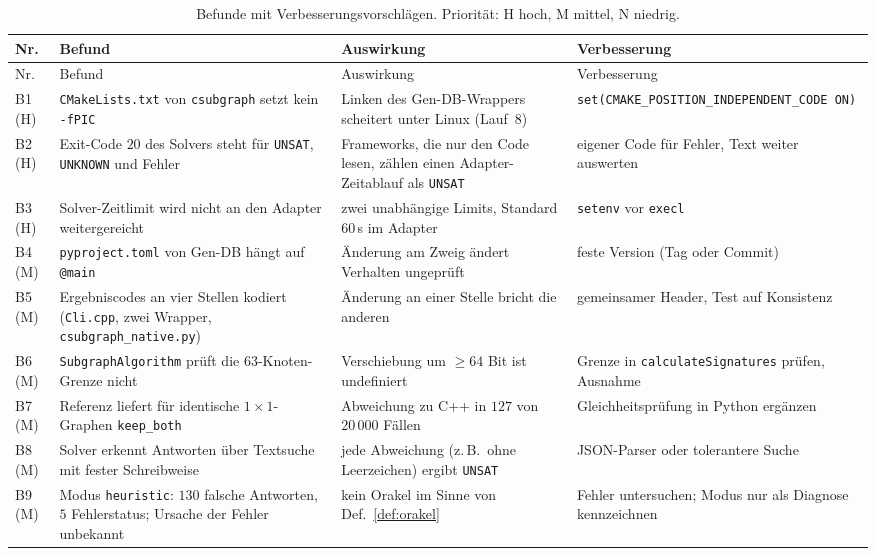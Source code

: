 {\small
\begin{longtable}{@{}L{1.0cm}L{5.3cm}L{4.5cm}L{3.9cm}@{}}
	\caption{Befunde mit Verbesserungsvorschlägen. Priorität: H hoch, M mittel, N niedrig.}
	\label{tab:befunde} \\
	\toprule
	Nr. & Befund & Auswirkung & Verbesserung \\
	\midrule
	\endfirsthead
	\toprule
	Nr. & Befund & Auswirkung & Verbesserung \\
	\midrule
	\endhead
	B1 (H) & \texttt{CMakeLists.txt} von \texttt{csubgraph} setzt kein \texttt{-fPIC} & Linken des Gen-DB-Wrappers scheitert unter Linux (Lauf~8) & \texttt{set(CMAKE\_POSITION\_INDEPENDENT\_CODE ON)} \\[0.4em]
	B2 (H) & Exit-Code $20$ des Solvers steht für \texttt{UNSAT}, \texttt{UNKNOWN} und Fehler & Frameworks, die nur den Code lesen, zählen einen Adapter-Zeitablauf als \texttt{UNSAT} & eigener Code für Fehler, Text weiter auswerten \\[0.4em]
	B3 (H) & Solver-Zeitlimit wird nicht an den Adapter weitergereicht & zwei unabhängige Limits, Standard $60$\,s im Adapter & \texttt{setenv} vor \texttt{execl} \\[0.4em]
	B4 (M) & \texttt{pyproject.toml} von Gen-DB hängt auf \texttt{@main} & Änderung am Zweig ändert Verhalten ungeprüft & feste Version (Tag oder Commit) \\[0.4em]
	B5 (M) & Ergebniscodes an vier Stellen kodiert (\texttt{Cli.cpp}, zwei Wrapper, \texttt{csubgraph\_native.py}) & Änderung an einer Stelle bricht die anderen & gemeinsamer Header, Test auf Konsistenz \\[0.4em]
	B6 (M) & \texttt{SubgraphAlgorithm} prüft die $63$-Knoten-Grenze nicht & Verschiebung um $\ge 64$ Bit ist undefiniert & Grenze in \texttt{calculateSignatures} prüfen, Ausnahme \\[0.4em]
	B7 (M) & Referenz liefert für identische $1{\times}1$-Graphen \texttt{keep\_both} & Abweichung zu C++ in $127$ von $20\,000$ Fällen & Gleichheitsprüfung in Python ergänzen \\[0.4em]
	B8 (M) & Solver erkennt Antworten über Textsuche mit fester Schreibweise & jede Abweichung (z.\,B.\ ohne Leerzeichen) ergibt \texttt{UNSAT} & JSON-Parser oder tolerantere Suche \\[0.4em]
	B9 (M) & Modus \texttt{heuristic}: $130$ falsche Antworten, $5$ Fehlerstatus; Ursache der Fehler unbekannt & kein Orakel im Sinne von Def.~\ref{def:orakel} & Fehler untersuchen; Modus nur als Diagnose kennzeichnen \\[0.4em]

\end{longtable}}
